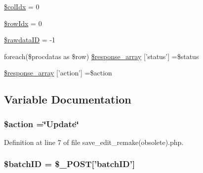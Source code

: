 \begin{DoxyCompactItemize}
\item 
\hyperlink{save__edit__remake_07obsolete_08_8php_a2efb2f950a559a8fda8c5b114c5ea10f}{\$col\-Idx} = 0
\item 
\hyperlink{save__edit__remake_07obsolete_08_8php_a2457f3fab8183bd163626612df265a7e}{\$row\-Idx} = 0
\item 
\hyperlink{save__edit__remake_07obsolete_08_8php_a7e1df84a3733bb1672c8485fa286658d}{\$rawdata\-I\-D} = -\/1
\item 
foreach(\$procdatas as \$row) \hyperlink{save__edit__remake_07obsolete_08_8php_a7a23fc905184e8d9769c6c2948032a18}{\$response\-\_\-array} \mbox{[}'status'\mbox{]} =\$status
\item 
\hyperlink{save__edit__remake_07obsolete_08_8php_ae768978a0cdc416c0d63d798c85c8784}{\$response\-\_\-array} \mbox{[}'action'\mbox{]} =\$action
\end{DoxyCompactItemize}


\subsection{Variable Documentation}
\hypertarget{save__edit__remake_07obsolete_08_8php_aa698a3e72116e8e778be0e95d908ee30}{
\subsubsection[{\$action}]{\setlength{\rightskip}{0pt plus 5cm}\$action =\char`\"{}Update\char`\"{}}}\label{save__edit__remake_07obsolete_08_8php_aa698a3e72116e8e778be0e95d908ee30}


Definition at line 7 of file save\-\_\-edit\-\_\-remake(obsolete).\-php.

\hypertarget{save__edit__remake_07obsolete_08_8php_aaa6d122ea9cb55b210aadd86e5654a74}{
\subsubsection[{\$batch\-I\-D}]{\setlength{\rightskip}{0pt plus 5cm}\${\bf batch\-I\-D} = \$\-\_\-\-P\-O\-S\-T\mbox{[}'{\bf batch\-I\-D}'\mbox{]}}}\label{save__edit__remake_07obsolete_08_8php_aaa6d122ea9cb55b210aadd86e5654a74}


